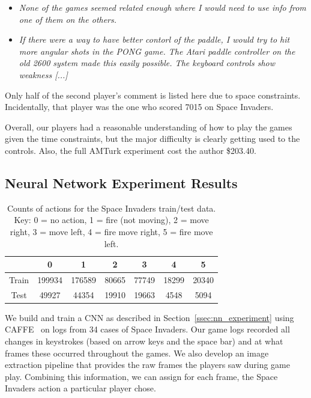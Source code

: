 \documentclass[letterpaper, 10 pt, conference]{ieeeconf}  %
\begin{document}
\begin{itemize}
    \item \emph{None of the games seemed related enough where I would need to use info from one of
    them on the others.}
    \item \emph{If there were a way to have better contorl of the paddle, I would try to
    hit more angular shots in the PONG game. The Atari paddle controller on the old 2600 system made
    this easily possible. The keyboard controls show weakness [...]}
\end{itemize}

Only half of the second player's comment is listed here due to space constraints. Incidentally, that
player was the one who scored 7015 on Space Invaders.

Overall, our players had a reasonable understanding of how to play the games given the time
constraints, but the major difficulty is clearly getting used to the controls. Also, the full AMTurk
experiment cost the author \$203.40.

\subsection{Neural Network Experiment Results}\label{ssec:nn_results}

\begin{table}[t]
\centering
\begin{tabular}{|c||c|c|c|c|c|c|}
\hline
  & 0 & 1 & 2 & 3 & 4 & 5 \\
\hline
Train & 199934 & 176589 & 80665 & 77749 & 18299 & 20340 \\
Test  & 49927  & 44354 & 19910 & 19663 & 4548 & 5094 \\
\hline
\end{tabular}
\caption{Counts of actions for the Space Invaders train/test data. Key: 0 = no action, 1 =
fire (not moving), 2 = move right, 3 = move left, 4 = fire move right, 5 = fire move left.}
\label{tab:data_distribution}
\end{table}

We build and train a CNN as described in Section~\ref{ssec:nn_experiment} using CAFFE~\cite{caffe}
on logs from 34 cases of Space Invaders. Our game logs recorded all changes in keystrokes (based on
arrow keys and the space bar) and at what frames these occurred throughout the games. We also develop
an image extraction pipeline that provides the raw frames the players saw during game play.
Combining this information, we can assign for each frame, the Space Invaders action a particular
player chose.
\end{document}
